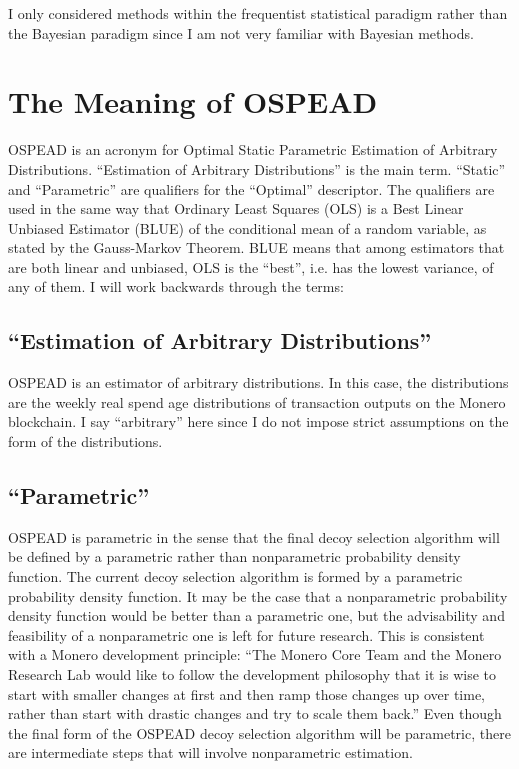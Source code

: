 \documentclass[english]{article}
\begin{document}
I only considered methods within the frequentist statistical paradigm
rather than the Bayesian paradigm since I am not very familiar with
Bayesian methods.

\section{The Meaning of OSPEAD}

OSPEAD is an acronym for Optimal Static Parametric Estimation of Arbitrary
Distributions. ``Estimation of Arbitrary Distributions'' is the
main term. ``Static'' and ``Parametric'' are qualifiers for the
``Optimal'' descriptor. The qualifiers are used in the same way
that Ordinary Least Squares (OLS) is a Best Linear Unbiased Estimator
(BLUE) of the conditional mean of a random variable, as stated by
the Gauss-Markov Theorem. BLUE means that among estimators that are
both linear and unbiased, OLS is the ``best'', i.e. has the lowest
variance, of any of them. I will work backwards through the terms:

\subsection{\textquotedblleft Estimation of Arbitrary Distributions\textquotedblright}

OSPEAD is an estimator of arbitrary distributions. In this case, the
distributions are the weekly real spend age distributions of transaction
outputs on the Monero blockchain. I say ``arbitrary'' here since
I do not impose strict assumptions on the form of the distributions.

\subsection{\textquotedblleft Parametric\textquotedblright}

OSPEAD is parametric in the sense that the final decoy selection algorithm
will be defined by a parametric rather than nonparametric probability
density function. The current decoy selection algorithm is formed
by a parametric probability density function. It may be the case that
a nonparametric probability density function would be better than
a parametric one, but the advisability and feasibility of a nonparametric
one is left for future research. This is consistent with a Monero
development principle: ``The Monero Core Team and the Monero Research
Lab would like to follow the development philosophy that it is wise
to start with smaller changes at first and then ramp those changes
up over time, rather than start with drastic changes and try to scale
them back.'' \cite{Mackenzie2015} Even though the final form of
the OSPEAD decoy selection algorithm will be parametric, there are
intermediate steps that will involve nonparametric estimation.
\end{document}
